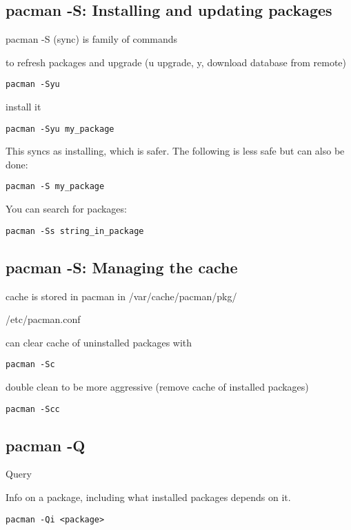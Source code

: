 
\subsection{pacman -S: Installing and updating packages}


pacman -S (sync) is family of commands

to refresh packages and upgrade (u upgrade, y, download database from remote)

\begin{verbatim}
pacman -Syu
\end{verbatim}


install it
\begin{verbatim}
pacman -Syu my_package
\end{verbatim}

This syncs as installing, which is safer. The following is less safe but can also be done:

\begin{verbatim}
pacman -S my_package
\end{verbatim}

You can search for packages:

\begin{verbatim}
pacman -Ss string_in_package
\end{verbatim}


\subsection{pacman -S: Managing the cache}


cache is stored in pacman in /var/cache/pacman/pkg/


/etc/pacman.conf


can clear cache of uninstalled packages with
\begin{verbatim}
pacman -Sc
\end{verbatim}

double clean to be more aggressive (remove cache of installed packages)
\begin{verbatim}
pacman -Scc
\end{verbatim}




\subsection{pacman -Q}

Query

Info on a package, including what installed packages depends on it.
\begin{verbatim}
pacman -Qi <package>
\end{verbatim}


